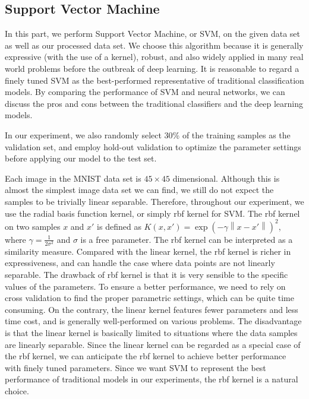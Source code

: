 \documentclass{article}
\begin{document}
\subsection{Support Vector Machine}
In this part, we perform Support Vector Machine, or SVM, on the given data set as well as our processed data set. We choose this algorithm because it is generally expressive (with the use of a kernel), robust, and also widely applied in many real world problems before the outbreak of deep learning. It is reasonable to regard a finely tuned SVM as the best-performed representative of traditional classification models. By comparing the performance of SVM and neural networks, we can discuss the pros and cons between the traditional classifiers and the deep learning models.

In our experiment, we also randomly select 30\% of the training samples as the validation set, and employ hold-out validation to optimize the parameter settings before applying our model to the test set. 

Each image in the MNIST data set is $45\times 45$ dimensional. Although this is almost the simplest image data set we can find, we still do not expect the samples to be trivially linear separable. Therefore, throughout our experiment, we use the radial basis function kernel, or simply rbf kernel for SVM. The rbf kernel on two samples $x$ and $x'$ is defined as $K(x,x') = \exp(- \gamma \left\|x-x' \right\|)^2$, where $\gamma = \frac{1}{2\sigma^2}$ and $\sigma$ is a free parameter. The rbf kernel can be interpreted as a similarity measure. Compared with the linear kernel, the rbf kernel is richer in expressiveness, and can handle the case where data points are not linearly separable. The drawback of rbf kernel is that it is very sensible to the specific values of the parameters. To ensure a better performance, we need to rely on cross validation to find the proper parametric settings, which can be quite time consuming. On the contrary, the linear kernel features fewer parameters and less time cost, and is generally well-performed on various problems. The disadvantage is that the linear kernel is basically limited to situations where the data samples are linearly separable. Since the linear kernel can be regarded as a special case of the rbf kernel, we can anticipate the rbf kernel to achieve better performance with finely tuned parameters. Since we want SVM to represent the best performance of traditional models in our experiments, the rbf kernel is a natural choice. 
\end{document}
